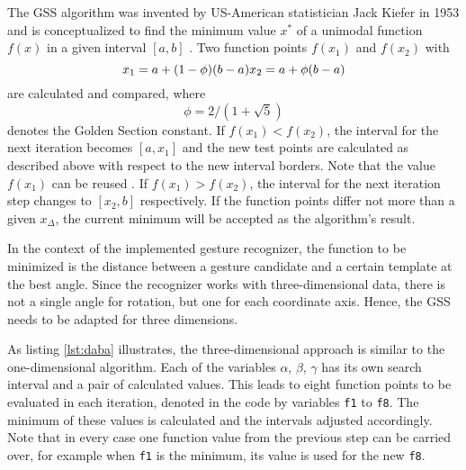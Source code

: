 The \ac{GSS} algorithm was invented by US-American statistician Jack Kiefer in 1953  and is conceptualized to find the minimum value $x^*$ of a unimodal function $f(x)$ in a given interval $[a,b]$ \cite{Kiefer1953}. Two function points $f(x_1)$ and $f(x_2)$ with 
\[ x_1=a+(1-\phi)(b-a) \\
x_2=a+\phi(b-a) \]
are calculated and compared, where 
\[\phi=2/(1+\sqrt{5})\]
denotes the Golden Section constant. If $f(x_1) < f(x_2)$, the interval for the next iteration becomes $[a,x_1]$ and the new test points are calculated as described above with respect to the new interval borders. Note that the value $f(x_1)$ can be reused \cite{chang2009n}. If $f(x_1) > f(x_2)$, the interval for the next iteration step changes to $[x_2, b]$ respectively. If the function points differ not more than a given $x_\Delta$, the current minimum will be accepted as the algorithm's result.

In the context of the implemented gesture recognizer, the function to be minimized is the distance between a gesture candidate and a certain template at the best angle. Since the recognizer works with three-dimensional data, there is not a single angle for rotation, but one for each coordinate axis. Hence, the \ac{GSS} needs to be adapted for three dimensions.

As listing \ref{lst:daba} illustrates, the three-dimensional approach is similar to the one-dimensional algorithm. Each of the variables $\alpha$, $\beta$, $\gamma$ has its own search interval and a pair of calculated values. This leads to eight function points to be evaluated in each iteration, denoted in the code by variables \texttt{f1} to \texttt{f8}. The minimum of these values is calculated and the intervals adjusted accordingly. Note that in every case one function value from the previous step can be carried over, for example when \texttt{f1} is the minimum, its value is used for the new \texttt{f8}.

